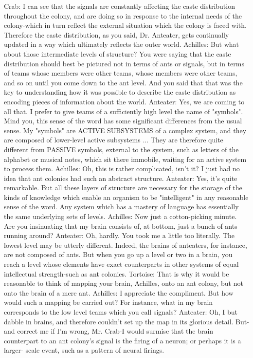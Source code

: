 Crab: I can see that the signals are constantly affecting the caste distribution throughout
    the colony, and are doing so in response to the internal needs of the colony-which in
    turn reflect the external situation which the colony is faced with. Therefore the caste
    distribution, as you said, Dr. Anteater, gets continually updated in a way which
    ultimately reflects the outer world.
Achilles: But what about those intermediate levels of structure? You were saying that the
    caste distribution should best be pictured not in terms of ants or signals, but in terms
    of teams whose members were other teams, whose members were other teams, and
    so on until you come down to the ant level. And you said that that was the key to
    understanding how it was possible to describe the caste distribution as encoding
    pieces of information about the world.
Anteater: Yes, we are coming to all that. I prefer to give teams of a sufficiently high level
    the name of "symbols". Mind you, this sense of the word has some significant
    differences from the usual sense. My "symbols" are ACTIVE SUBSYSTEMS of a
    complex system, and they are composed of lower-level active subsystems ... They are
    therefore quite different from PASSIVE symbols, external to the system, such as
    letters of the alphabet or musical notes, which sit there immobile, waiting for an
    active system to process them.
Achilles: Oh, this is rather complicated, isn't it? I just had no idea that ant colonies had
    such an abstract structure.
Anteater: Yes, it's quite remarkable. But all these layers of structure are necessary for the
    storage of the kinds of knowledge which enable an organism to be "intelligent" in
    any reasonable sense of the word. Any system which has a mastery of language has
    essentially the same underlying sets of levels.
Achilles: Now just a cotton-picking minute. Are you insinuating that my brain consists
    of, at bottom, just a bunch of ants running around?
Anteater: Oh, hardly. You took me a little too literally. The lowest level may be utterly
    different. Indeed, the brains of anteaters, for instance, are not composed of ants. But
    when you go up a level or two in a brain, you reach a level whose elements have
    exact counterparts in other systems of equal intellectual strength-such as ant colonies.
Tortoise: That is why it would be reasonable to think of mapping your brain, Achilles,
    onto an ant colony, but not onto the brain of a mere ant.
Achilles: I appreciate the compliment. But how would such a mapping be carried out?
    For instance, what in my brain corresponds to the low level teams which you call
    signals?
Anteater: Oh, I but dabble in brains, and therefore couldn't set up the map in its glorious
    detail. But-and correct me if I'm wrong, Mr. Crab-I would surmise that the brain
    counterpart to an ant colony's signal is the firing of a neuron; or perhaps it is a larger-
    scale event, such as a pattern of neural firings.




